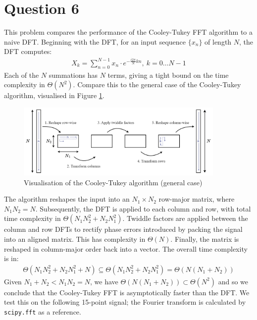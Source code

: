 \section*{Question 6}

This problem compares the performance of the Cooley-Tukey FFT algorithm to a naive DFT. Beginning with the DFT, for an input sequence $\{x_n\}$ of length $N$, the DFT computes:
\begin{align}
    X_k = \sum_{n=0}^{N-1} x_n \cdot e^{-\frac{i2\pi}{N}kn},\ k = 0 \ldots N - 1
\end{align}
Each of the $N$ summations has $N$ terms, giving a tight bound on the time complexity in $\Theta(N^2)$. Compare this to the general case of the Cooley-Tukey algorithm, visualised in Figure \ref{fig:viz_cooley_tukey}.

\begin{figure}[ht]
    \centering
    \includegraphics[width=0.9\textwidth]{images/q6_viz_cooley_tukey.png}
    \caption{Visualisation of the Cooley-Tukey algorithm (general case)}
    \label{fig:viz_cooley_tukey}
\end{figure}

The algorithm reshapes the input into an $N_1\times N_2$ row-major matrix, where $N_1N_2=N$. Subsequently, the DFT is applied to each column and row, with total time complexity in $\Theta(N_1N_2^2+N_2N_1^2)$. Twiddle factors are applied between the column and row DFTs to rectify phase errors introduced by packing the signal into an aligned matrix. This has complexity in $\Theta(N)$. Finally, the matrix is reshaped in column-major order back into a vector. The overall time complexity is in:
\begin{align}
    \Theta(N_1N_2^2 + N_2N_1^2 + N) \subseteq \Theta(N_1N_2^2 + N_2N_1^2) = \Theta(N(N_1+N_2))
\end{align}
Given $N_1+N_2<N_1N_2=N$, we have $\Theta(N(N_1+N_2))\subset \Theta(N^2)$ and so we conclude that the Cooley-Tukey FFT is asymptotically faster than the DFT. We test this on the following 15-point signal; the Fourier transform is calculated by \texttt{scipy.fft} as a reference.

